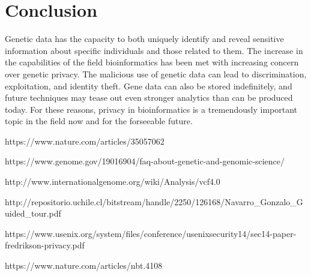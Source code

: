 \section{Conclusion}

Genetic data has the capacity to both uniquely identify and reveal sensitive information about specific individuals and those related to them. The increase in the capabilities of the field bioinformatics has been met with increasing concern over genetic privacy. The malicious use of genetic data can lead to discrimination, exploitation, and identity theft. Gene data can also be stored indefinitely, and future techniques may tease out even stronger analytics than can be produced today. For these reasons, privacy in bioinformatics is a tremendously important topic in the field now and for the forseeable future.

\begin{thebibliography}{5}
  
  https://www.nature.com/articles/35057062

  https://www.genome.gov/19016904/faq-about-genetic-and-genomic-science/

  http://www.internationalgenome.org/wiki/Analysis/vcf4.0
  
  http://repositorio.uchile.cl/bitstream\-/handle/2250/126168/Navarro\_Gonzalo\-\_Guided\_tour.pdf

  https://www.usenix.org/system/files/conference/usenixsecurity14/sec14-paper-fredrikson-privacy.pdf

  https://www.nature.com/articles/nbt.4108
  
\end{thebibliography}
